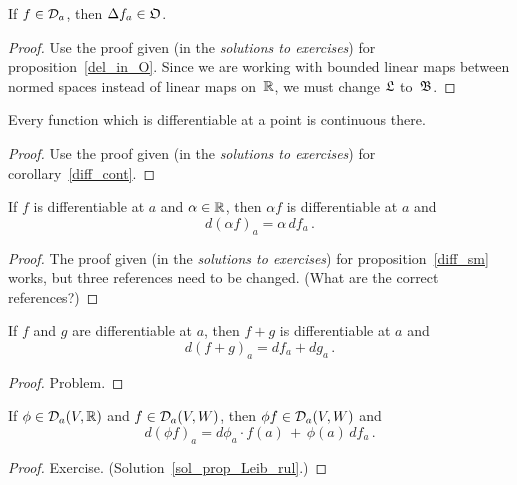 \begin{prop}\label{prop_diff_O}  If $f \in \mathcal{D}_a$, then $\Delta f_a \in \mathfrak{O}$.
\end{prop}

\begin{proof} Use the proof given (in the \emph{solutions to exercises}) for
proposition~\ref{del_in_O}.  Since we are working with bounded linear maps between normed
spaces instead of linear maps on~$\mathbb{R}$, we must change $\mathfrak{L}$ to~$\mathfrak{B}$.
\end{proof}

\begin{cor}\label{cor_diff_cont} Every function which is differentiable at a point is continuous
there.
\end{cor}

\begin{proof} Use the proof given (in the \emph{solutions to exercises}) for
corollary~\ref{diff_cont}.  \end{proof}

\begin{prop}\label{prop_diff_sm}  If $f$ is differentiable at $a$ and $\alpha \in \mathbb{R}$, then
$\alpha f$ is differentiable at $a$ and
  \[ d(\alpha f)_a = \alpha\,df_a\,. \]
\end{prop}

\begin{proof} The proof given (in the \emph{solutions to exercises}) for
proposition~\ref{diff_sm} works, but three references need to be changed.  (What are the
correct references?)
\end{proof}

\begin{prop}\label{prop_diff_sum} If $f$ and $g$ are differentiable at $a$, then $f + g$ is
differentiable at $a$ and
  \[ d(f+g)_a = df_a + dg_a\,. \]
\end{prop}

\begin{proof} Problem.  \ns  \end{proof}

\begin{prop}\label{prop_Leib_rul}
If $\phi \in \mathcal{D}_a(V,\mathbb{R})$ and $f \in \mathcal{D}_a(V,W)$, then $\phi f \in \mathcal{D}_a(V,W)$ and
  \[ d(\phi f)_a = d\phi_a \cdot f(a) \,+\, \phi(a)\,df_a\,. \]
\end{prop}

\begin{proof} Exercise.  (Solution~\ref{sol_prop_Leib_rul}.)  \ns   \end{proof}

